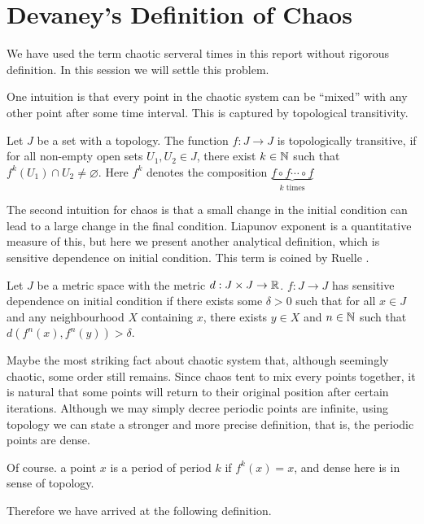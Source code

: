 \section{Devaney's Definition of Chaos}

We have used the term chaotic serveral times in this report without rigorous definition. 
In this session we will settle this problem.

One intuition is that every point in the chaotic system can be ``mixed'' with any other point after some time interval. 
This is captured by topological transitivity.
\begin{defn}
	Let $J$ be a set with a topology.
	The function $f: J \rightarrow J$ is topologically transitive, if for all non-empty open sets $U_1, U_2 \in J$, there exist $k \in \mathbb{N}$ such that $f^k(U_1) \cap U_2 \neq \varnothing$. 
	Here $f^k$ denotes the composition $\underbrace{f \circ f \cdots \circ f}_{k \text{ times}}$
\end{defn}

The second intuition for chaos is that a small change in the initial condition can lead to a large change in the final condition. 
Liapunov exponent is a quantitative measure of this, but here we present another analytical definition, which is sensitive dependence on initial condition. This term is coined by Ruelle \cite{Ruelle-1978}.
\begin{defn}
	Let $J$ be a metric space with the metric $d: J \times J \rightarrow \mathbb{R}$.
	$f: J \rightarrow J$ has sensitive dependence on initial condition if there exists some $\delta > 0$ such that for all $x \in J$ and any neighbourhood $X$ containing $x$, there exists $y \in X$ and $n \in \mathbb{N}$ such that $d(f^n(x), f^n(y)) > \delta$.
\end{defn}

Maybe the most striking fact about chaotic system that, although seemingly chaotic, some order still remains.
Since chaos tent to mix every points together, it is natural that some points will return to their original position after certain iterations.
Although we may simply decree periodic points are infinite, using topology we can state a stronger and more precise definition, that is, the periodic points are dense.

Of course. a point $x$ is a period of period $k$ if $f^k(x)=x$, and dense here is in sense of topology.

Therefore we have arrived at the following definition.

